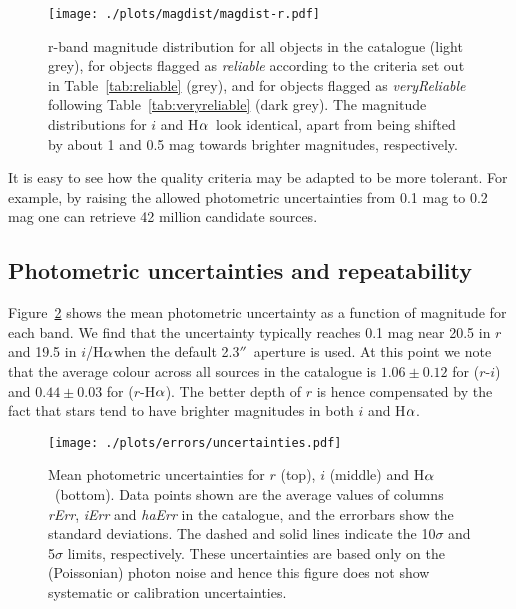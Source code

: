 \documentclass[useAMS,usenatbib]{mn2e}
\def\ha{\mbox{H$\rm \alpha$}}
\def\arcsec{$''$}
\begin{document}
\begin{figure}
    \texttt{[image: ./plots/magdist/magdist-r.pdf]} 
    \caption{r-band magnitude distribution for all objects in the catalogue 
    (light grey), for objects flagged as \emph{reliable} 
    according to the criteria set out in Table~\ref{tab:reliable} (grey),
    and for objects flagged as \emph{veryReliable} 
    following Table~\ref{tab:veryreliable} (dark grey).
    The magnitude distributions for $i$ and \ha\
    look identical, apart from being shifted
    by about 1 and 0.5 mag towards brighter magnitudes,
    respectively.}
    \label{fig:magdist}
\end{figure}

It is easy to see how the quality criteria
may be adapted to be more tolerant.
For example, by raising the allowed photometric uncertainties
from 0.1 mag to 0.2 mag one can retrieve 42 million candidate sources.

\subsection{Photometric uncertainties and repeatability}

Figure~\ref{fig:uncertainties} shows the mean photometric
uncertainty as a function of magnitude for each band.
We find that the uncertainty typically
reaches 0.1 mag near 20.5 in $r$ 
and 19.5 in $i$/\ha when the default 2.3\arcsec\ aperture is used.
At this point we note that the average colour
across all sources in the catalogue is
$1.06\pm0.12$ for ($r$-$i$) and $0.44\pm0.03$ for ($r$-\ha).
The better depth of $r$ is hence compensated
by the fact that stars tend to have 
brighter magnitudes in both $i$ and \ha.

\begin{figure}
    \texttt{[image: ./plots/errors/uncertainties.pdf]} 
    \caption{Mean photometric uncertainties
             for $r$ (top), $i$ (middle) and \ha\ (bottom).
             Data points shown are the average values of
             columns \emph{rErr}, \emph{iErr} and \emph{haErr}
             in the catalogue, 
             and the errorbars show the standard deviations.
             The dashed and solid lines indicate 
             the 10$\sigma$ and 5$\sigma$ limits, respectively.
             These uncertainties are based only on the (Poissonian)
             photon noise and hence this figure does not show
             systematic or calibration uncertainties.}
    \label{fig:uncertainties}
\end{figure}
\end{document}
